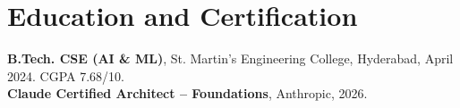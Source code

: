 \section{Education and Certification}
{\small \textbf{B.Tech. CSE (AI \& ML)}, St. Martin's Engineering College, Hyderabad, April 2024. CGPA 7.68/10.\\
\textbf{Claude Certified Architect -- Foundations}, Anthropic, 2026.\par}
